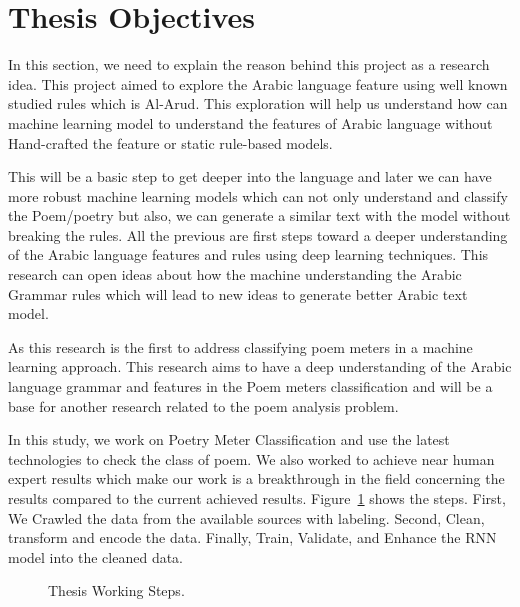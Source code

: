 \section{Thesis Objectives}
In this section, we need to explain the reason behind this project as a research idea. This project aimed to explore the Arabic language feature using well known studied rules which is Al-Arud. This exploration will help us understand how can machine learning model to understand the features of Arabic language without Hand-crafted the feature or static rule-based models.

This will be a basic step to get deeper into the language and later we can have more robust machine learning models which can not only understand and classify the Poem/poetry but also, we can generate a similar text with the model without breaking the rules. All the previous are first steps toward a deeper understanding of the Arabic language features and rules using deep learning techniques. This research can open ideas about how the machine understanding the Arabic Grammar rules which will lead to new ideas to generate better Arabic text model.

{\color{red}
As this research is the first to address classifying poem meters in a machine learning approach. This research aims to have a deep understanding of the Arabic language grammar and features in the Poem meters classification and will be a base for another research related to the poem analysis problem.
}

In this study, we work on Poetry Meter Classification and use the latest technologies to check the class of poem. We also worked to achieve near human expert results which make our work is a breakthrough in the field concerning the results compared to the current achieved results. Figure~\ref{Fig:Thesis_Cycle} shows the steps. First, We Crawled the data from the available sources with labeling. Second, Clean, transform and encode the data. Finally, Train, Validate, and Enhance the RNN model into the cleaned data.

\begin{figure}[!t]
   
  \caption{Thesis Working Steps.}
  \label{Fig:Thesis_Cycle}
\end{figure}


\clearpage


%	
%	
%	



